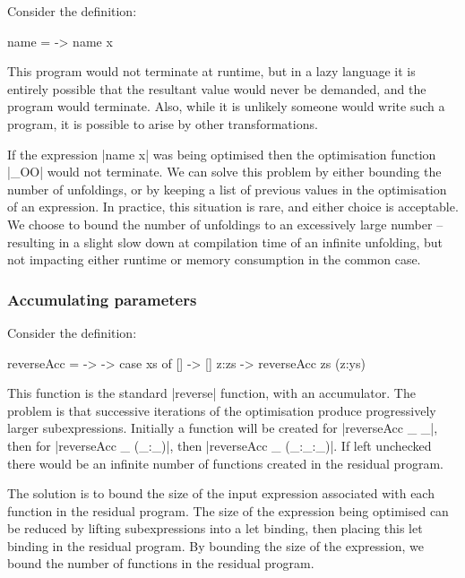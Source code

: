 \documentclass{llncs}
\begin{document}
Consider the definition:

\begin{code}
name = \x -> name x
\end{code}

This program would not terminate at runtime, but in a lazy language it is entirely possible that the resultant value would never be demanded, and the program would terminate. Also, while it is unlikely someone would write such a program, it is possible to arise by other transformations.

If the expression |name x| was being optimised then the optimisation function |_OO| would not terminate. We can solve this problem by either bounding the number of unfoldings, or by keeping a list of previous values in the optimisation of an expression. In practice, this situation is rare, and either choice is acceptable. We choose to bound the number of unfoldings to an excessively large number -- resulting in a slight slow down at compilation time of an infinite unfolding, but not impacting either runtime or memory consumption in the common case.

\subsubsection{Accumulating parameters}

Consider the definition:

\begin{code}
reverseAcc = \xs -> \ys -> case  xs of
                                 []    -> []
                                 z:zs  -> reverseAcc zs (z:ys)
\end{code}

This function is the standard |reverse| function, with an accumulator. The problem is that successive iterations of the optimisation produce progressively larger subexpressions. Initially a function will be created for |reverseAcc _ _|, then for |reverseAcc _ (_:_)|, then |reverseAcc _ (_:_:_)|. If left unchecked there would be an infinite number of functions created in the residual program.

The solution is to bound the size of the input expression associated with each function in the residual program. The size of the expression being optimised can be reduced by lifting subexpressions into a let binding, then placing this let binding in the residual program. By bounding the size of the expression, we bound the number of functions in the residual program.
\end{document}
